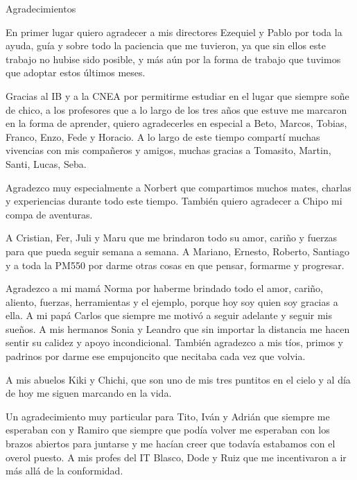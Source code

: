 \documentclass[12pt,papel,oneside]{ibtesis}
\begin{document}
\begin{biblio}

\end{biblio}


\begin{postliminary}

\listoffigures                  %

\listoftables                   %






\begin{seccion}{Agradecimientos}
\begin{small}	

En primer lugar quiero agradecer a mis directores Ezequiel y Pablo por toda la ayuda, guía y sobre todo la paciencia que me tuvieron, ya que sin ellos este trabajo no hubise sido posible, y más aún por la forma de trabajo que tuvimos que adoptar estos últimos meses.

Gracias al IB y a la CNEA por permitirme estudiar en el lugar que siempre soñe de chico, a los profesores que a lo largo de los tres años que estuve me marcaron en la forma de aprender, quiero agradecerles en especial a Beto, Marcos, Tobias, Franco, Enzo, Fede y Horacio. A lo largo de este tiempo compartí muchas vivencias con mis compañeros y amigos, muchas gracias a Tomasito, Martin, Santi, Lucas, Seba. 

Agradezco muy especialmente a Norbert que compartimos muchos mates, charlas y experiencias durante todo este tiempo. También quiero agradecer a Chipo mi compa de aventuras.

A Cristian, Fer, Juli y Maru que me brindaron todo su amor, cariño y fuerzas para que pueda seguir semana a semana. A Mariano, Ernesto, Roberto, Santiago y a toda la PM550 por darme otras cosas en que pensar, formarme y progresar.

Agradezco a mi mamá Norma por haberme brindado todo el amor, cariño, aliento, fuerzas, herramientas y el ejemplo, porque  hoy soy quien soy gracias a ella. A mi papá Carlos que siempre me motivó a seguir adelante y  seguir mis sueños. A mis hermanos Sonia y Leandro que sin importar la distancia me hacen sentir su calidez y apoyo incondicional. También agradezco a mis tíos, primos y padrinos  por darme ese empujoncito que necitaba cada vez que volvia.

A mis abuelos Kiki y Chichi, que son uno de mis tres puntitos en el cielo y al día de hoy me siguen marcando en la vida.

Un agradecimiento muy particular para Tito, Iván y Adrián  que siempre me esperaban con y Ramiro que siempre que podía volver me esperaban con los brazos abiertos para juntarse y me hacían creer que todavía estabamos con el overol puesto. A mis profes del IT Blasco, Dode y Ruiz que me incentivaron a ir más allá de la conformidad.


\end{small}
\end{seccion}
\end{postliminary}
\end{document}
